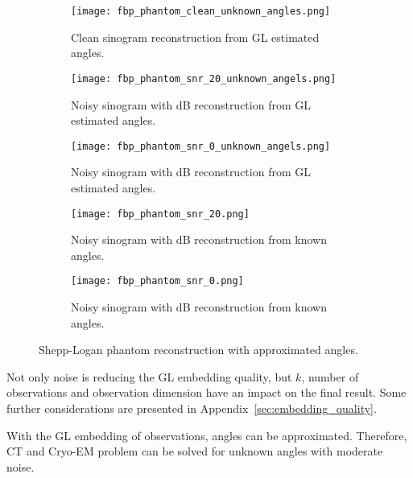 \begin{figure}[H]
    \captionsetup[subfigure]{justification=centering}
    \centering
    \begin{subfigure}[t]{0.3\textwidth}
        \texttt{[image: fbp\_phantom\_clean\_unknown\_angles.png]}
        \caption{Clean sinogram reconstruction from GL estimated angles.}
        \label{fig:clean_reco_unknown}
    \end{subfigure}\hfill
    \begin{subfigure}[t]{0.3\textwidth}
      \texttt{[image: fbp\_phantom\_snr\_20\_unknown\_angels.png]}
      \caption{Noisy sinogram with  dB reconstruction from GL estimated angles.}
      \label{fig:noisy_snr20_reco_unknown}
    \end{subfigure}\hfill
    \begin{subfigure}[t]{0.3\textwidth}
      \texttt{[image: fbp\_phantom\_snr\_0\_unknown\_angels.png]}
      \caption{Noisy sinogram with  dB reconstruction from GL estimated angles.}
      \label{fig:noisy_snr0_reco_unknown}
    \end{subfigure}

    \begin{subfigure}[t]{0.3\textwidth}
      \texttt{[image: fbp\_phantom\_snr\_20.png]}
      \caption{Noisy sinogram with  dB reconstruction from known angles.}
      \label{fig:noisy_snr20_reco_known}
    \end{subfigure}\hfill
    \begin{subfigure}[t]{0.3\textwidth}
      \texttt{[image: fbp\_phantom\_snr\_0.png]}
      \caption{Noisy sinogram with  dB reconstruction from known angles.}
      \label{fig:noisy_snr0_reco_known}
    \end{subfigure}

    \caption{Shepp-Logan phantom reconstruction with approximated angles.}
    \label{fig:phantom_fbp_unknown_angles}
  \end{figure}

  Not only noise is reducing the GL embedding quality, but $k$, number of observations 
  and observation dimension have an impact on the final result.
  Some further considerations are presented in Appendix~\ref{sec:embedding_quality}.

  \begin{tcolorbox}[colback=red!5!white,colframe=red!75!black]
    With the GL embedding of observations, angles can be approximated.
    Therefore, CT and Cryo-EM problem can be solved for unknown angles with moderate noise.
  \end{tcolorbox}

